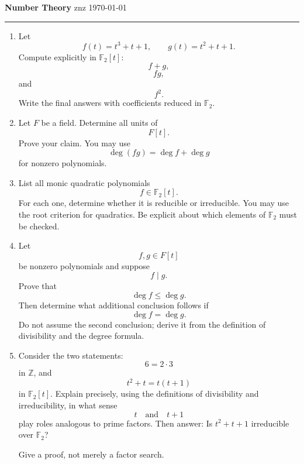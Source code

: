 \documentclass[12pt]{article}
\begin{document}
\noindent
{\large\bfseries Number Theory}
\hfill
znz
\quad
\today

\hrule
\medskip

\begin{enumerate}
  \item
        Let
        \[
        f(t)=t^3+t+1,
        \qquad
        g(t)=t^2+t+1.
        \]Compute explicitly in \(\mathbb F_2[t]\):
        \[
        f+g,
        \]\[
        fg,
        \]and
        \[
        f^2.
        \]Write the final answers with coefficients reduced in \(\mathbb F_2\).
  \item
        Let \(F\) be a field.
        Determine all units of
        \[
        F[t].
        \]Prove your claim.
        You may use
        \[
        \deg(fg)=\deg f+\deg g
        \]for nonzero polynomials.
  \item
        List all monic quadratic polynomials
        \[
        f\in\mathbb F_2[t].
        \]For each one, determine whether it is reducible or irreducible.
        You may use the root criterion for quadratics.
        Be explicit about which elements of \(\mathbb F_2\) must be checked.
  \item
        Let
        \[
        f,g\in F[t]
        \]be nonzero polynomials and suppose
        \[
        f\mid g.
        \]Prove that
        \[
        \deg f\le\deg g.
        \]Then determine what additional conclusion follows if
        \[
        \deg f=\deg g.
        \]Do not assume the second conclusion; derive it from the definition of divisibility and the degree formula.
  \item
        Consider the two statements:
        \[
        6=2\cdot3
        \]in \(\mathbb Z\), and
        \[
        t^2+t=t(t+1)
        \]in \(\mathbb F_2[t]\).
        Explain precisely, using the definitions of divisibility and irreducibility, in what sense
        \[
        t
        \quad\text{and}\quad
        t+1
        \]play roles analogous to prime factors.
        Then answer:
        Is \(t^2+t+1\) irreducible over \(\mathbb F_2\)?

        Give a proof, not merely a factor search.
\end{enumerate}
\end{document}
